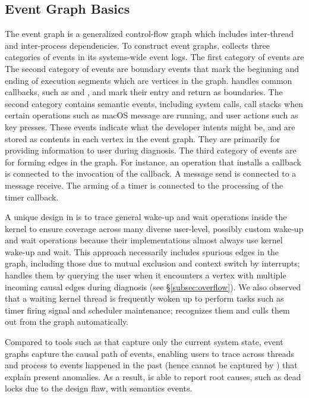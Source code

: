 \subsection{Event Graph Basics}\label{subsec:eventgraph}

The event graph is a generalized control-flow graph which includes inter-thread
and inter-process dependencies. To construct event graphs, \xxx collects three
categories of events in its systems-wide event logs. The first category of
events are The second category of events are boundary events that mark the
beginning and ending of execution segments which are vertices in the graph.
\xxx handles common callbacks, such as  and
, and mark their entry and return as boundaries. The
second category contains semantic events, including system calls, call stacks
when certain operations such as macOS message are running, and user actions such
as key presses. These events indicate what the developer intents might be, and
are stored as contents in each vertex in the event graph. They are primarily for
providing information to user during diagnosis. The third category of events
are for forming edges in the graph. For instance, an operation that installs
a callback is connected to the invocation of the callback. A message send is
connected to a message receive. The arming of a timer is connected to the
processing of the timer callback.

A unique design in \xxx is to trace general wake-up and wait operations inside
the kernel to ensure coverage across many diverse user-level, possibly custom
wake-up and wait operations because their implementations almost always use
kernel wake-up and wait. This approach necessarily includes spurious edges
in the graph, including those due to mutual exclusion and context switch by
interrupts; \xxx handles them by querying the user when it encounters a vertex
with multiple incoming causal edges during diagnosis (see \S\ref{subsec:overflow}).
We also observed that a waiting kernel thread is frequently woken up to perform
tasks such as timer firing signal and scheduler maintenance; \xxx recognizes
them and culls them out from the graph automatically.

Compared to tools such as \spindump that capture only the current system state,
event graphs capture the causal path of events, enabling users to trace across
threads and process to events happened in the past (hence cannot be captured by
\spindump) that explain present anomalies. As a result, \xxx is able to report
root causes, such as dead locks due to the design flaw, with semantics
events.

